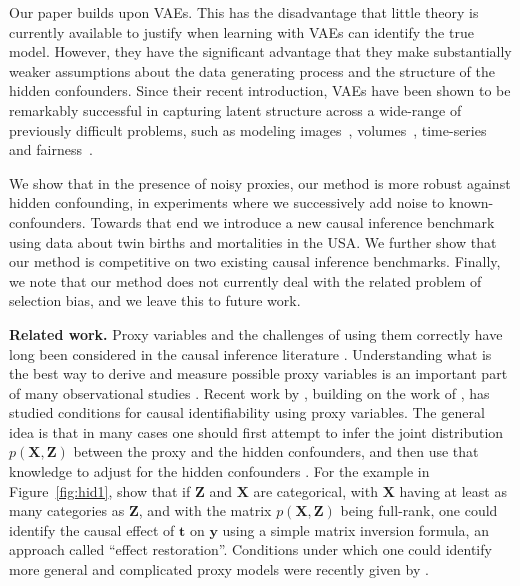 \documentclass{article}
\def\*#1{\mathbf{#1}}
\begin{document}
Our paper builds upon VAEs. This has the disadvantage that little theory is currently available to justify when learning with VAEs can identify the true model. However, they have the significant advantage that they make substantially weaker assumptions about the data generating process and the structure of the hidden confounders. Since their recent introduction, VAEs have been shown to be remarkably successful in capturing latent structure across a wide-range of previously difficult problems, such as modeling images~\citep{gregor2015draw}, volumes~\citep{rezende2016unsupervised}, time-series~\citep{chung2015recurrent} and fairness~\citep{louizos2015variational}.

We show that in the presence of noisy proxies, our method is more robust against hidden confounding, in experiments where we successively add noise to known-confounders. Towards that end we introduce a new causal inference benchmark using data about twin births and mortalities in the USA. We further show that our method is competitive on two existing causal inference benchmarks. 
Finally, we note that our method does not currently deal with the related problem of selection bias, and we leave this to future work.







 
{\bf Related work.} \;
Proxy variables and the challenges of using them correctly have long been considered in the causal inference literature \citep{wickens1972note,frost1979proxy}. Understanding what is the best way to derive and measure possible proxy variables is an important part of many observational studies \citep{filmer2001estimating,kolenikov2009socioeconomic,wooldridge2009estimating}.
Recent work by \citet{cai2008identifying,greenland2008bias}, building on the work of \citet{greenland1983correcting,selen1986adjusting}, has studied conditions for causal identifiability using proxy variables.
The general idea is that in many cases one should first attempt to infer the joint distribution $p(\*X,\*Z)$ between the proxy and the hidden confounders, and then use that knowledge to adjust for the hidden confounders \citep{wooldridge2009estimating,pearl2012measurement,kuroki2014measurement,miao2016identifying,edwards2015all}.
For the example in Figure~\ref{fig:hid1}, \citet{cai2008identifying,greenland2008bias,pearl2012measurement} show that if $\*Z$ and $\*X$ are categorical, with $\*X$ having at least as many categories as $\*Z$, and with the matrix $p(\*X,\*Z)$ being full-rank, one could identify the causal effect of $\*t$ on $\*y$ using a simple matrix inversion formula, an approach called ``effect restoration''.
Conditions under which one could identify more general and complicated proxy models were recently given by \citep{miao2016identifying}. 
\end{document}
